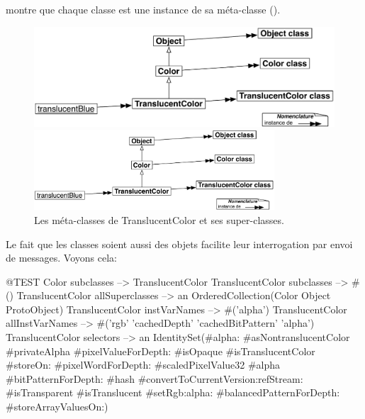 \documentclass[a4paper,10pt,twoside]{book}
\begin{document}
\noindent
{} montre que chaque classe est une instance de sa méta-classe ().

\begin{center}
\begin{figure}[!ht]
\ifluluelse
	{\centerline {\includegraphics[width=\textwidth]{TranslucentMetaclasses}}}
	{\centerline {\includegraphics[width=0.8\textwidth]{TranslucentMetaclasses}}}
\caption{Les méta-classes de TranslucentColor et ses super-classes\label{fig:translucentmetaclasses}.}
\end{figure}
\end{center}


Le fait que les classes soient aussi des objets facilite leur interrogation par envoi de messages.
Voyons cela:
\begin{code}{@TEST}
Color subclasses                           --> {TranslucentColor}
TranslucentColor subclasses         --> #()
TranslucentColor allSuperclasses  --> an OrderedCollection(Color Object ProtoObject)
TranslucentColor instVarNames     --> #('alpha')
TranslucentColor allInstVarNames --> #('rgb' 'cachedDepth' 'cachedBitPattern' 'alpha')
TranslucentColor selectors             --> an IdentitySet(#alpha: #asNontranslucentColor #privateAlpha #pixelValueForDepth: #isOpaque #isTranslucentColor #storeOn: #pixelWordForDepth: #scaledPixelValue32 #alpha #bitPatternForDepth: #hash #convertToCurrentVersion:refStream: #isTransparent #isTranslucent #setRgb:alpha: #balancedPatternForDepth: #storeArrayValuesOn:)
\end{code}
\end{document}
